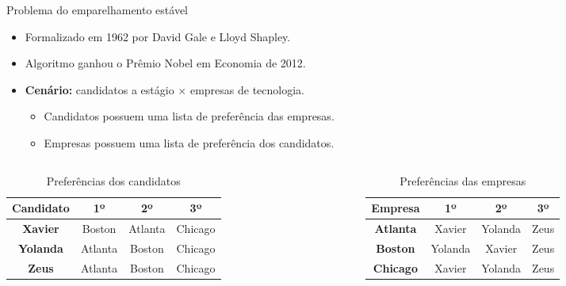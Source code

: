 \begin{frame}[t]{Problema do emparelhamento estável}
	\begin{itemize}
		\item Formalizado em 1962 por David Gale e Lloyd Shapley.
		\item Algoritmo ganhou o Prêmio Nobel em Economia de 2012.
		\item \textbf{Cenário:} candidatos a estágio $\times$ empresas de tecnologia.
		\begin{itemize}
			\item Candidatos possuem uma lista de preferência das empresas.
			\item Empresas possuem uma lista de preferência dos candidatos.
		\end{itemize}
	\end{itemize}

	\pause

	\vspace{-15pt}

	\begin{columns}
		\captionsetup[table]{skip=0pt}
		\begin{column}[b]{0.48\textwidth}
			\begin{table}
				\centering
				\scriptsize
				\begin{tabular}{|c|c|c|c|}
					\hline
					\textbf{Candidato} & \textbf{1º} & \textbf{2º} & \textbf{3º} \\ \hline
					 \textbf{Xavier}   &   Boston    &   Atlanta   &   Chicago   \\
					 \textbf{Yolanda}  &   Atlanta   &   Boston    &   Chicago   \\
					  \textbf{Zeus}    &   Atlanta   &   Boston    &   Chicago   \\ \hline
				\end{tabular}
				\caption{\scriptsize Preferências dos candidatos}
			\end{table}
		\end{column}
		\begin{column}[b]{0.48\textwidth}
			\begin{table}
				\centering
				\scriptsize
				\begin{tabular}{|c|c|c|c|}
					\hline
					\textbf{Empresa} & \textbf{1º} & \textbf{2º} & \textbf{3º} \\ \hline
					\textbf{Atlanta} &   Xavier    &   Yolanda   &    Zeus     \\
					\textbf{Boston}  &   Yolanda   &   Xavier    &    Zeus     \\
					\textbf{Chicago} &   Xavier    &   Yolanda   &    Zeus     \\ \hline
				\end{tabular}
				\caption{\scriptsize Preferências das empresas}
			\end{table}
		\end{column}
	\end{columns}


\end{frame}

